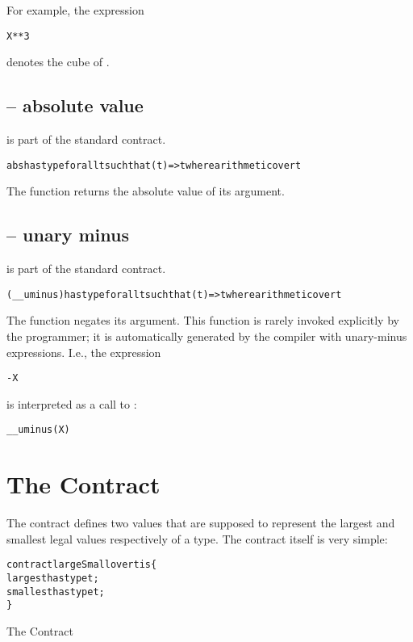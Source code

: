 For example, the expression
\begin{alltt}
X**3
\end{alltt}
denotes the cube of .

\subsection{ -- absolute value}
\label{abdFunction}
 is part of the standard  contract.
\begin{alltt}
abs has type for all t such that (t)=>t where arithmetic over t
\end{alltt}

The  function returns the absolute value of its argument.

\subsection{ -- unary minus}
\label{unaryMinus}
 is part of the standard  contract.
\begin{alltt}
(\_\_uminus) has type for all t such that (t)=>t where arithmetic over t
\end{alltt}
The  function negates its argument. This function is rarely invoked explicitly by the programmer; it is automatically generated by the compiler with unary-minus expressions. I.e., the expression
\begin{alltt}
-X
\end{alltt}
is interpreted as a call to :
\begin{alltt}
\_\_uminus(X)
\end{alltt}

\section{The  Contract}
\label{largeSmall}
The  contract defines two values that are supposed to represent the largest and smallest legal values respectively of a type. The contract itself is very simple:
\begin{program}
\begin{alltt}
contract largeSmall over t is \{
  largest has type t;
  smallest has type t;
\}
\end{alltt}
\caption{The  Contract}\label{largeSmallProg}
\end{program}

